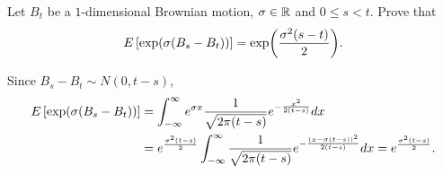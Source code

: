 \begin{exercise}{2.20}\label{ex:2.20}
    Let $B_t$ be a $1$-dimensional Brownian motion, $\sigma\in\mathbb{R}$ and 
    $0\leq s < t$. Prove that
    \begin{equation*}
        E\sbrc{\exp\pth{\sigma(B_s - B_t)}} = \exp\pth{\frac{\sigma^2(s-t)}{2}}.
    \end{equation*}
\end{exercise}
\begin{solution}
    Since $B_s-B_t\sim N(0, t-s)$, 
    \begin{equation*}
        \begin{split}
            E\sbrc{\exp\pth{\sigma(B_s - B_t)}} &= \int_{-\infty}^\infty e^{\sigma x}\frac{1}{\sqrt{2\pi(t-s)}}e^{-\frac{x^2}{2(t-s)}}dx \\
            &= e^{\frac{\sigma^2(t-s)}{2}}\int_{-\infty}^\infty \frac{1}{\sqrt{2\pi(t-s)}}e^{-\frac{(x - \sigma(t-s))^2}{2(t-s)}}dx 
            = e^{\frac{\sigma^2(t-s)}{2}}.
        \end{split}
    \end{equation*}
\end{solution}